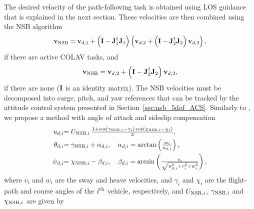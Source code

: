 The desired velocity of the path-following task is obtained using LOS guidance that is explained in the next section.
These velocities are then combined using the NSB algorithm
\begin{equation}
    \scale[0.95]{\mat{v}_{\rm NSB} = \mat{v}_{d, 1} + \left(\mat{I} - \mat{J}_1^{\dagger}\mat{J}_1\right)\left(\mat{v}_{d, 2} + \left(\mat{I} - \mat{J}_2^{\dagger}\mat{J}_2\right)\mat{v}_{d, 3}\right),}
\end{equation}
if there are active COLAV tasks, and
\begin{equation}
    \mathbf{v}_{\rm NSB} = \mathbf{v}_{d, 2} + \left(\mathbf{I} - \mathbf{J}_2^{\dagger}\mathbf{J}_2\right)\mathbf{v}_{d, 3}, \label{eq:nsb_5dof_NSB_nominal}
\end{equation}
if there are none ($\mathbf{I}$ is an identity matrix).
The NSB velocities must be decomposed into surge, pitch, and yaw references that can be tracked by the attitude control system presented in Section~\ref{sec:nsb_5dof_ACS}.
Similarly to \cite{arrichiello_formation_2006}, we propose a method with angle of attack and sideslip compensation
\begin{align}
    \scale[0.96]{u_{d, i}} & \scale[0.96]{= U_{{\rm NSB}, i}\,\frac{1 + \cos\left(\gamma_{{\rm NSB}, i} - \gamma_i\right)\cos\left(\chi_{{\rm NSB}, i} - \chi_i\right)}{2},} \label{eq:nsb_5dof_u_d}\\
    \scale[0.96]{\theta_{d, i}} & \scale[0.96]{= \gamma_{{\rm NSB}, i} + \alpha_{d, i}, \quad \alpha_{d, i} = \arctan\left(\frac{w_i}{u_{d, i}}\right),} \label{eq:nsb_5dof_theta_d} \\
    \scale[0.96]{\psi_{d, i}} & \scale[0.96]{= \chi_{{\rm NSB}, i} - \beta_{d, i}, \quad \beta_{d, i} = \arcsin\left(\frac{v_i}{\sqrt{u_{d, i}^2 + v_i^2 + w_i^2}}\right), } \label{eq:nsb_5dof_psi_d}
\end{align}
where $v_i$ and $w_i$ are the sway and heave velocities, and $\gamma_i$ and $\chi_i$ are the flight-path and course angles of the $i^{\rm th}$ vehicle, respectively, and $U_{{\rm NSB},i}$, $\gamma_{{\rm NSB},i}$ and $\chi_{{\rm NSB},i}$ are given by
